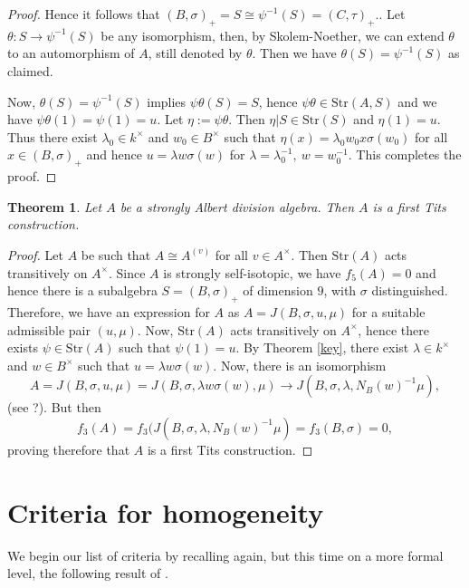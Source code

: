 \documentclass{amsart}
\newtheorem{thm}[equation]{Theorem}
\theoremstyle{definition} %
\theoremstyle{remark} %
\renewcommand{\:}{\colon\,}
\numberwithin{equation}{section}
\begin{document}
\begin{proof}
	Hence it follows that $(B,\sigma)_+=S \cong \psi^{-1}(S)=(C,\tau)_+.$. Let $\theta:S\longrightarrow\psi^{-1}(S)$ be any isomorphism, then, by Skolem-Noether, we can extend $\theta$ to an automorphism of $A$, still denoted by $\theta$. Then we have $\theta(S)=\psi^{-1}(S)$ as claimed. 
	
	Now, $\theta(S)=\psi^{-1}(S)$ implies $\psi\theta(S)=S$, hence $\psi\theta\in\text{Str}(A,S)$ and we have $\psi\theta(1)=\psi(1)=u$. Let $\eta:=\psi\theta$. Then $\eta|S\in\text{Str}(S)$ and $\eta(1)=u$. Thus there exist $\lambda_0\in k^{\times}$ and $w_0\in B^{\times}$ such that 
	$\eta(x)=\lambda_0 w_0 x \sigma(w_0)$ for all $x\in (B,\sigma)_+$ and hence $u=\lambda w\sigma(w)$ for $\lambda=\lambda_0^{-1},~w=w_0^{-1}$.
	This completes the proof.
	
\end{proof}

\begin{thm}\label{first-tits} Let $A$ be a strongly  Albert division algebra. Then $A$ is a first Tits construction.
\end{thm}

\begin{proof} Let $A$ be such that $A\cong A^{(v)}$ for all $v\in A^{\times}$. Then $\text{Str}(A)$ acts transitively on $A^{\times}$. Since $A$ is strongly self-isotopic, we have $f_5(A)=0$ and hence there is a subalgebra $S=(B,\sigma)_+$ of dimension $9$, with $\sigma$ distinguished. Therefore, we have an expression for $A$ as $A=J(B,\sigma, u, \mu)$ for a suitable admissible pair $(u,\mu)$. Now, $\text{Str}(A)$ acts transitively on $A^{\times}$, hence there exists $\psi\in\text{Str}(A)$ such that $\psi(1)=u$. By Theorem \ref{key}, there exist $\lambda\in k^{\times}$ and $w\in B^{\times}$ such that $u=\lambda w\sigma(w)$. Now, there is an isomorphism 
	$$A=J(B,\sigma, u, \mu)=J(B,\sigma, \lambda w\sigma(w), \mu)\longrightarrow J(B,\sigma, \lambda, N_B(w)^{-1}\mu),$$
	(see ?). But then 
	$$f_3(A)=f_3(J(B,\sigma, \lambda, N_B(w)^{-1}\mu)=f_3(B,\sigma)=0,$$
	proving therefore that $A$ is a first Tits construction.  
\end{proof}
\fi 

\section{Criteria for homogeneity} \label{redal} %
We begin our list of criteria by recalling again, but this time on a more formal level, the following result of \cite[Cor.~4.9]{MR734841}.
\end{document}
